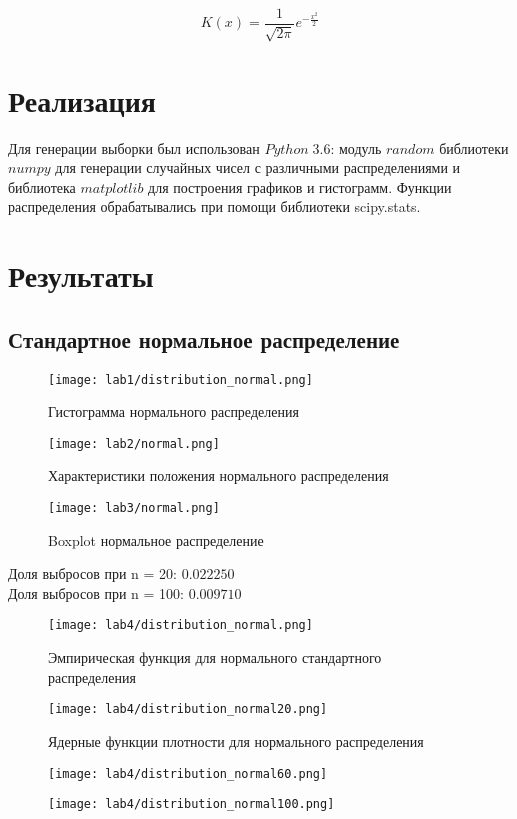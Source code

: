 \documentclass[a4]{article}
\begin{document}
\begin{equation}
    K(x) = \frac{1}{\sqrt{2\pi}}e^{-\frac{x^2}{2}}
\end{equation}
\section{Реализация}
Для генерации выборки был использован $Python\;3.6$: модуль $random$ библиотеки $numpy$ для генерации случайных чисел с различными распределениями и библиотека $matplotlib$ для построения графиков и гистограмм. Функции распределения обрабатывались при помощи библиотеки scipy.stats.

\section{Результаты}
\subsection{Стандартное нормальное распределение}
	\begin{figure}[H]
	\caption{Гистограмма нормального распределения}
	\texttt{[image: lab1/distribution\_normal.png]}
	\end{figure}
	\begin{figure}[H]
	\caption{Характеристики положения нормального распределения}
	\texttt{[image: lab2/normal.png]}
	\end{figure}
	\begin{figure}[H]
	\caption{Boxplot нормальное распределение }
	\texttt{[image: lab3/normal.png]}
	\end{figure}
	Доля выбросов при n = 20: $0.022250$\\
	Доля выбросов при n = 100: $0.009710$
	\begin{figure}[H]
	\caption{Эмпирическая функция для нормального стандартного распределения}
	\texttt{[image: lab4/distribution\_normal.png]}
	\end{figure}
	\begin{figure}[H]
	\caption{Ядерные функции плотности для нормального распределения}
	\texttt{[image: lab4/distribution\_normal20.png]}
	\end{figure}
	\begin{figure}[H]
	\texttt{[image: lab4/distribution\_normal60.png]}
	\end{figure}
	\begin{figure}[H]
	\texttt{[image: lab4/distribution\_normal100.png]}
	\end{figure}
\newpage
\end{document}

